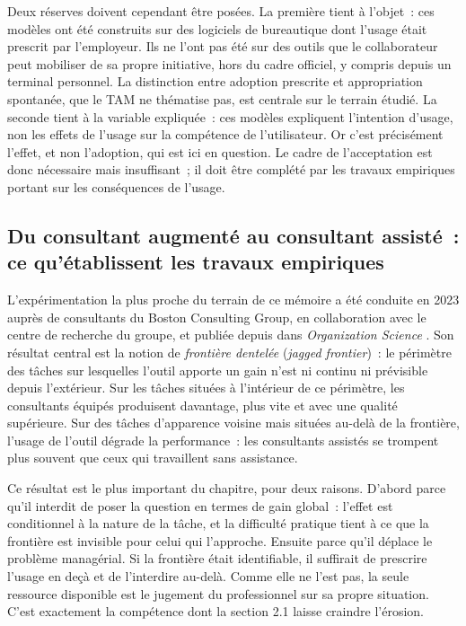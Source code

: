 Deux réserves doivent cependant être posées. La première tient à l'objet~: ces modèles ont
été construits sur des logiciels de bureautique dont l'usage était prescrit par
l'employeur. Ils ne l'ont pas été sur des outils que le collaborateur peut mobiliser de sa
propre initiative, hors du cadre officiel, y compris depuis un terminal personnel. La distinction
entre adoption prescrite et appropriation spontanée, que le TAM ne thématise pas, est
centrale sur le terrain étudié. La seconde tient à la variable expliquée~: ces modèles
expliquent l'intention d'usage, non les effets de l'usage sur la compétence de
l'utilisateur. Or c'est précisément l'effet, et non l'adoption, qui est ici en question. Le
cadre de l'acceptation est donc nécessaire mais insuffisant~; il doit être complété par les
travaux empiriques portant sur les conséquences de l'usage.

\subsection{Du consultant augmenté au consultant assisté~: ce qu'établissent les travaux
empiriques}

L'expérimentation la plus proche du terrain de ce mémoire a été conduite en 2023 auprès de
consultants du Boston Consulting Group, en collaboration avec le centre de recherche du
groupe, et publiée depuis dans \textit{Organization Science}
\cite{dellacqua2026}. Son résultat central est la notion de \textit{frontière dentelée}
(\textit{jagged frontier})~: le périmètre des tâches sur lesquelles l'outil apporte un gain
n'est ni continu ni prévisible depuis l'extérieur. Sur les tâches situées à l'intérieur de
ce périmètre, les consultants équipés produisent davantage, plus vite et avec une qualité
supérieure. Sur des tâches d'apparence voisine mais situées au-delà de la frontière, l'usage
de l'outil dégrade la performance~: les consultants assistés se trompent plus souvent que
ceux qui travaillent sans assistance.

Ce résultat est le plus important du chapitre, pour deux raisons. D'abord parce qu'il
interdit de poser la question en termes de gain global~: l'effet est conditionnel à la
nature de la tâche, et la difficulté pratique tient à ce que la frontière est invisible pour
celui qui l'approche. Ensuite parce qu'il déplace le problème managérial. Si la frontière
était identifiable, il suffirait de prescrire l'usage en deçà et de l'interdire au-delà.
Comme elle ne l'est pas, la seule ressource disponible est le jugement du professionnel sur
sa propre situation. C'est exactement la compétence dont la section 2.1 laisse craindre
l'érosion.

